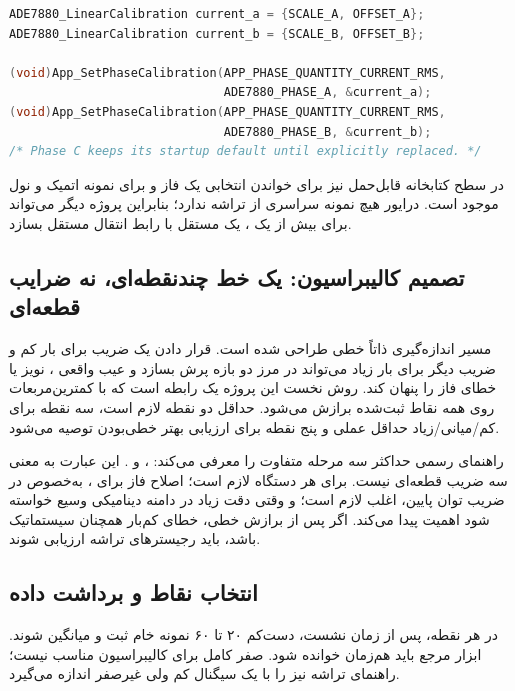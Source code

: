 \begin{LTR}
\begin{lstlisting}[language=C]
ADE7880_LinearCalibration current_a = {SCALE_A, OFFSET_A};
ADE7880_LinearCalibration current_b = {SCALE_B, OFFSET_B};

(void)App_SetPhaseCalibration(APP_PHASE_QUANTITY_CURRENT_RMS,
                              ADE7880_PHASE_A, &current_a);
(void)App_SetPhaseCalibration(APP_PHASE_QUANTITY_CURRENT_RMS,
                              ADE7880_PHASE_B, &current_b);
/* Phase C keeps its startup default until explicitly replaced. */
\end{lstlisting}
\end{LTR}

در سطح کتابخانه قابل‌حمل نیز
برای خواندن انتخابی یک فاز و
برای نمونه اتمیک  و نول موجود است. درایور هیچ نمونه سراسری از تراشه ندارد؛ بنابراین پروژه دیگر می‌تواند برای بیش از یک ، یک
مستقل با رابط انتقال مستقل بسازد.

\subsection{تصمیم کالیبراسیون: یک خط چندنقطه‌ای، نه ضرایب قطعه‌ای}
مسیر اندازه‌گیری  ذاتاً خطی طراحی شده است. قرار دادن یک ضریب برای بار کم و ضریب دیگر برای بار زیاد می‌تواند در مرز دو بازه پرش بسازد و عیب واقعی ، نویز یا خطای فاز را پنهان کند. روش نخست این پروژه یک رابطه
است که با کمترین‌مربعات روی همه نقاط ثبت‌شده برازش می‌شود. حداقل دو نقطه لازم است، سه نقطه برای کم/میانی/زیاد حداقل عملی و پنج نقطه برای ارزیابی بهتر خطی‌بودن توصیه می‌شود.

راهنمای رسمی  حداکثر سه مرحله متفاوت را معرفی می‌کند: ،  و . این عبارت به معنی سه ضریب قطعه‌ای نیست.  برای هر دستگاه لازم است؛ اصلاح فاز برای ، به‌خصوص در ضریب توان پایین، اغلب لازم است؛ و  وقتی دقت زیاد در دامنه دینامیکی وسیع خواسته شود اهمیت پیدا می‌کند. اگر پس از برازش خطی، خطای کم‌بار همچنان سیستماتیک باشد، باید رجیسترهای  تراشه ارزیابی شوند.

\subsection{انتخاب نقاط و برداشت داده}
در هر نقطه، پس از زمان نشست، دست‌کم ۲۰ تا ۶۰ نمونه خام ثبت و میانگین شوند. ابزار مرجع باید هم‌زمان خوانده شود. صفر کامل برای کالیبراسیون  مناسب نیست؛ راهنمای تراشه نیز  را با یک سیگنال کم ولی غیرصفر اندازه می‌گیرد.

